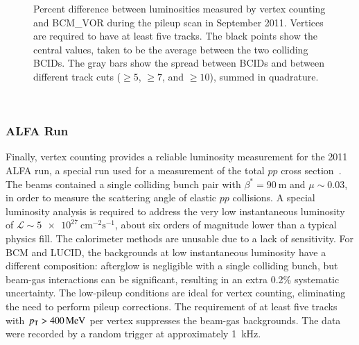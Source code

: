 \begin{figure}[htbp]
	\centering
	\caption{Percent difference between luminosities measured by vertex counting and BCM\_VOR during the pileup scan in September 2011. Vertices are required to have at least five tracks. The black points show the central values, taken to be the average between the two colliding BCIDs. The gray bars show the spread between BCIDs and between different track cuts ($\geq5$, $\geq7$, and $\geq10$), summed in quadrature.}
	\label{fig:luminosity-vertexing-muscan}
\end{figure}

\ 

\subsubsection{ALFA Run}

Finally, vertex counting provides a reliable luminosity measurement for the 2011 ALFA run, a special run used for a measurement of the total $pp$ cross section~\cite{TheATLASCollaboration:2014joa}. The beams contained a single colliding bunch pair with $\beta^{*}=\SI{90}{\meter}$ and $\mu\sim0.03$, in order to measure the scattering angle of elastic $pp$ collisions. A special luminosity analysis is required to address the very low instantaneous luminosity of $\mathcal{L}\sim\SI[per-mode=symbol]{5e27}{\centi\meter\tothe{-2}\second\tothe{-1}}$, about six orders of magnitude lower than a typical physics fill. The calorimeter methods are unusable due to a lack of sensitivity. For BCM and LUCID, the backgrounds at low instantaneous luminosity have a different composition: afterglow is negligible with a single colliding bunch, but beam-gas interactions can be significant, resulting in an extra 0.2\% systematic uncertainty. The low-pileup conditions are ideal for vertex counting, eliminating the need to perform pileup corrections. The requirement of at least five tracks with $p_{\text{T}}>\SI{400}{\mega\electronvolt}$ per vertex suppresses the beam-gas backgrounds. The data were recorded by a random trigger at approximately \SI{1}{\kilo\hertz}. 

